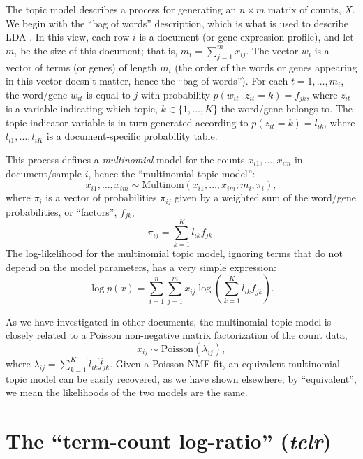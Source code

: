 \documentclass[final]{siamart171218}
\begin{document}
The topic model describes a process for generating an $n \times m$
matrix of counts, $X$. We begin with the ``bag of words'' description,
which is what is used to describe LDA \cite{blei-2003}. In this view,
each row $i$ is a document (or gene expression profile), and let $m_i$
be the size of this document; that is, $m_i = \sum_{j=1}^m
x_{ij}$. The vector $w_i$ is a vector of terms (or genes) of length
$m_i$ (the order of the words or genes appearing in this vector
doesn't matter, hence the ``bag of words''). For each $t = 1, \ldots,
m_{i}$, the word/gene $w_{it}$ is equal to $j$ with probability
$p(w_{it} \,|\, z_{it} = k) = f_{jk}$, where $z_{it}$ is a variable
indicating which topic, $k \in \{1, \ldots, K\}$ the word/gene belongs
to. The topic indicator variable is in turn generated according to
$p(z_{it} = k) = l_{ik}$, where $l_{i1}, \ldots, l_{iK}$ is a
document-specific probability table.

This process defines a {\em multinomial} model for the 
counts $x_{i1}, \ldots, x_{im}$ in document/sample $i$, hence the
``multinomial topic model'':
\begin{equation}
x_{i1}, \ldots, x_{im} \sim
\mathrm{Multinom}(x_{i1}, \ldots, x_{im}; m_i, \pi_i),
\end{equation}
where $\pi_i$ is a vector of probabilities $\pi_{ij}$ given by a
weighted sum of the word/gene probabilities, or ``factors'', $f_{jk}$,
\begin{equation}
\pi_{ij} = \sum_{k=1}^K l_{ik} f_{jk}.
\end{equation}
The log-likelihood for the multinomial topic model, ignoring terms
that do not depend on the model parameters, has a very simple
expression:
\begin{equation}
\log p(x) = \sum_{i=1}^n \sum_{j=1}^m
x_{ij} \log({\textstyle \sum_{k=1}^K l_{ik} f_{jk}}).
\end{equation}

As we have investigated in other documents, the multinomial topic
model is closely related to a Poisson non-negative matrix
factorization of the count data,
\begin{equation}
x_{ij} \sim \mathrm{Poisson}(\lambda_{ij}),
\end{equation}
where $\lambda_{ij} = \sum_{k=1}^K \hat{l}_{ik} \hat{f}_{jk}$. Given a
Poisson NMF fit, an equivalent multinomial topic model can be easily
recovered, as we have shown elsewhere; by ``equivalent'', we mean the
likelihoods of the two models are the same.

\section{The ``term-count log-ratio'' ({\em tclr})}
\end{document}
